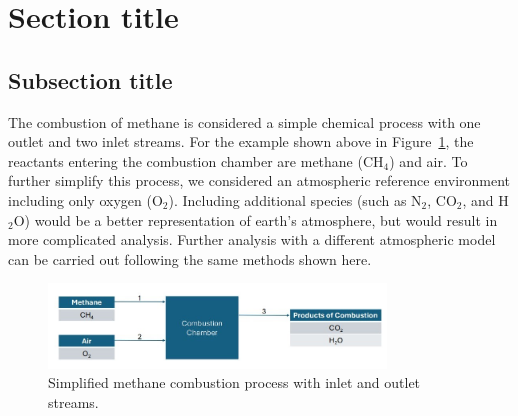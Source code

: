 \documentclass[energies,article,submit,pdftex,moreauthors]{Definitions/mdpi}
\begin{document}



\appendixstart
\appendix
\section[\appendixname~\thesection]{Section title}
\subsection[\appendixname~\thesubsection]{Subsection title}



The combustion of methane is considered a simple chemical process
with one outlet and two inlet streams.
For the example shown above in Figure~\ref{fig:combustion_process},
the reactants entering the combustion chamber are methane (CH$_4$) and air.
To further simplify this process,
we considered an atmospheric reference environment
including only oxygen (O$_2$).
Including additional species
(such as N$_2$, CO$_2$, and H$_2$O) would be a better representation
of earth's atmosphere,
but would result in more complicated analysis.
Further analysis with a different atmospheric model
can be carried out following the same methods shown here.

\begin{figure}
\centering
\includegraphics[width=0.8\textwidth]{images/combustion1}
\caption{Simplified methane combustion process with inlet and outlet streams.}
\label{fig:combustion_process}
\end{figure}
\end{document}
